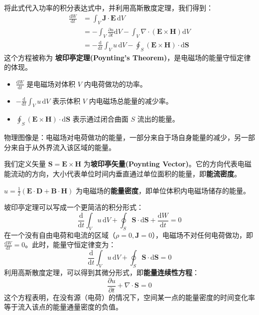 \documentclass[fontset=none]{ctexart}
\begin{document}
将此式代入功率的积分表达式中，并利用高斯散度定理，我们得到：
\begin{equation}
\begin{aligned}
    \frac{\mathrm{d}W}{\mathrm{d}t} &= \int_V \bm{J} \cdot \bm{E} \, \mathrm{d}V \\
    &= -\int_V \frac{\partial u}{\partial t} \mathrm{d}V - \int_V \nabla \cdot (\bm{E} \times \bm{H}) \mathrm{d}V \\
    &= -\frac{\mathrm{d}}{\mathrm{d}t}\int_V u \, \mathrm{d}V - \oint_S (\bm{E} \times \bm{H}) \cdot \mathrm{d}\bm{S}
\end{aligned}
\end{equation}
这个方程被称为 \textbf{坡印亭定理(Poynting's Theorem)}，是电磁场的能量守恒定律的体现。
\begin{itemize}
    \item $\frac{\mathrm{d}W}{\mathrm{d}t}$ 是电磁场对体积 $V$ 内电荷做功的功率。
    \item $-\frac{\mathrm{d}}{\mathrm{d}t}\int_V u \, \mathrm{d}V$ 表示体积 $V$ 内电磁场总能量的减少率。
    \item $\oint_S (\bm{E} \times \bm{H}) \cdot \mathrm{d}\bm{S}$ 表示通过闭合曲面 $S$ 流出的能量。
\end{itemize}
物理图像是：电磁场对电荷做功的能量，一部分来自于场自身能量的减少，另一部分来自于从外界流入该区域的能量。

\begin{definition}[坡印亭矢量与能量流密度]
我们定义矢量 $\bm{S} = \bm{E} \times \bm{H}$ 为\textbf{坡印亭矢量(Poynting Vector)}。它的方向代表电磁能流动的方向，大小代表单位时间内垂直通过单位面积的能量，即\textbf{能流密度}。
\end{definition}

\begin{definition}[电磁场能量密度]
$u = \frac{1}{2}(\bm{E}\cdot\bm{D} + \bm{B}\cdot\bm{H})$ 为电磁场的\textbf{能量密度}，即单位体积内电磁场储存的能量。
\end{definition}

坡印亭定理可以写成一个更简洁的积分形式：
\begin{equation}
    \frac{\mathrm{d}}{\mathrm{d}t}\int_V u \, \mathrm{d}V + \oint_S \bm{S} \cdot \mathrm{d}\bm{S} + \frac{\mathrm{d}W}{\mathrm{d}t} = 0
\end{equation}
在一个没有自由电荷和电流的区域（$\rho=0, \bm{J}=0$），电磁场不对任何电荷做功，即 $\frac{\mathrm{d}W}{\mathrm{d}t} = 0$。此时，能量守恒定律变为：
\begin{equation}
    \frac{\mathrm{d}}{\mathrm{d}t}\int_V u \, \mathrm{d}V + \oint_S \bm{S} \cdot \mathrm{d}\bm{S} = 0
\end{equation}
利用高斯散度定理，可以得到其微分形式，即\textbf{能量连续性方程}：
\begin{equation}
    \frac{\partial u}{\partial t} + \nabla \cdot \bm{S} = 0
\end{equation}
这个方程表明，在没有源（电荷）的情况下，空间某一点的能量密度的时间变化率等于流入该点的能量通量密度的负值。
\end{document}
